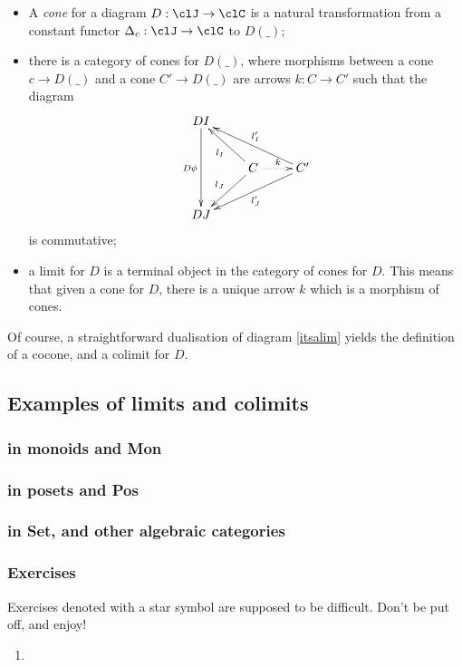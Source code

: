\documentclass[11pt]{article}
\begin{document}
\begin{itemize}
	\item A \emph{cone} for a diagram $D : \clJ \to \clC$ is a natural transformation from a constant functor $\Delta_c : \clJ \to \clC$ to $D(\_)$;
	\item there is a category of cones for $D(\_)$, where morphisms between a cone $c\to D(\_)$ and a cone $C'\to D(\_)$ are arrows $k : C\to C'$ such that the diagram
	      \[
		      \vcenter{\xymatrix{
				      DI \ar[dd]_{D\phi}&& \\
				      &C\ar@{.>}[r]^k \ar[ul]^{l_I}\ar[dl]_{l_J}& C' \ar[ull]_{l_I'}\ar[dll]^{l_J'}\\
				      DJ
			      }}
	      \]
	      is commutative;
	\item a limit for $D$ is a terminal object in the category of cones for $D$. This means that given a cone for $D$, there is a unique arrow $k$ which is a morphism of cones.
\end{itemize}
Of course, a straightforward dualisation of diagram \eqref{itsalim} yields the definition of a cocone, and a colimit for $D$.

\subsection{Examples of limits and colimits}

\subsubsection{in monoids and Mon}

\subsubsection{in posets and Pos}

\subsubsection{in Set, and other algebraic categories}
\subsubsection{Exercises}
Exercises denoted with a star symbol are supposed to be difficult. Don't be put off, and enjoy!

\footnotesize
\begin{enumerate}
	\item 
\end{enumerate}
\end{document}
